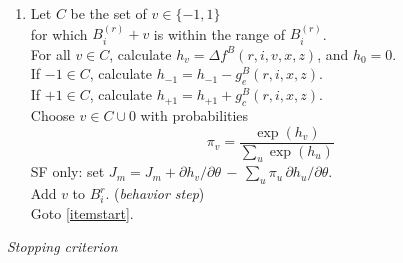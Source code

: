 \documentclass[a4paper,12pt,fleqn]{article}
\begin{document}
\begin{enumerate}
      For all $j \in C$, calculate $h_j = \Delta f^N(r,i,j,x,z)$, and $h_i = 0$.\\
      For all $j \in C$ with $N^{r}_{ij} = 1$, calculate $h_j = h_j - g_e^N(r,i,j,x,z)$.\\
      For all $j \in C$ with $N^{r}_{ij} = 0$, calculate $h_j = h_j + g_c^N(r,i,j,x,z)$.\\
      Choose $j \in C \cup {i}$ with probabilities
      \begin{equation}
         \pi_j = \frac{\exp(h_j) }{ \sum_k \exp(h_k) }               \label{pij}
      \end{equation}
      SF only: set
      $J_m = J_m + \partial h_j / \partial \theta \,-\, \sum_k \pi_k\, \partial h_k / \partial \theta  $.\\
      If $j \neq i$, toggle $N^{r}_{ij}$. (\emph{network step})\\
      Goto \ref{itemstart}.
\newpage
\item \label{itemz}
      Let $C$ be the set of $v \in \{-1, 1\}$ \\
      for which $B^{(r)}_i + v$ is
      within the range of $B^{(r)}_i$.\\
      For all $v \in C$, calculate $h_v = \Delta f^B(r,i,v,x,z)$, and $h_0 = 0$.\\
      If $-1 \in C$, calculate $h_{-1} = h_{-1} - g_e^B(r,i,x,z)$.\\
      If $+1 \in C$, calculate $h_{+1} = h_{+1} + g_c^B(r,i,x,z)$.\\
      Choose $v \in C \cup {0}$ with probabilities
      \begin{equation}
         \pi_v = \frac{  \exp(h_v) }{ \sum_u \exp(h_u) }              \label{piv}
      \end{equation}
      SF only: set
      $J_m = J_m + \partial h_v / \partial \theta \,-\, \sum_u \pi_u \, \partial h_u / \partial \theta  $.\\
      Add $v$ to $B^{r}_{i}$. (\emph{behavior step})\\
      Goto \ref{itemstart}.
\end{enumerate}
\medskip

\emph{Stopping criterion}
\end{document}

